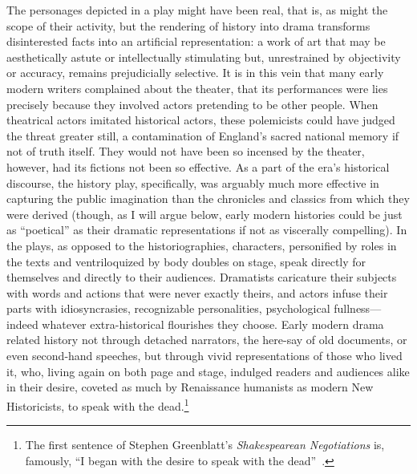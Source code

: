 The personages depicted in a play might have been real, that is, as might the scope of their activity, but the rendering of history into drama transforms disinterested facts into an artificial representation: a work of art that may be aesthetically astute or intellectually stimulating but, unrestrained by objectivity or accuracy, remains prejudicially selective. It is in this vein that many early modern writers complained about the theater, that its performances were lies precisely because they involved actors pretending to be other people. When theatrical actors imitated historical actors, these polemicists could have judged the threat greater still, a contamination of England's sacred national memory if not of truth itself. They would not have been so incensed by the theater, however, had its fictions not been so effective. As a part of the era's historical discourse, the history play, specifically, was arguably much more effective in capturing the public imagination than the chronicles and classics from which they were derived (though, as I will argue below, early modern histories could be just as ``poetical'' as their dramatic representations if not as viscerally compelling). In the plays, as opposed to the historiographies, characters, personified by roles in the texts and ventriloquized by body doubles on stage, speak directly for themselves and directly to their audiences. Dramatists caricature their subjects with words and actions that were never exactly theirs, and actors infuse their parts with idiosyncrasies, recognizable personalities, psychological fullness---indeed whatever extra-historical flourishes they choose. Early modern drama related history not through detached narrators, the here-say of old documents, or even second-hand speeches, but through vivid representations of those who lived it, who, living again on both page and stage, indulged readers and audiences alike in their desire, coveted as much by Renaissance humanists as modern New Historicists, to speak with the dead.\footnote{The first sentence of Stephen Greenblatt's \emph{Shakespearean Negotiations} is, famously, ``I began with the desire to speak with the dead''~\cite[1]{greenblatt_shakespearean_1988}.}

